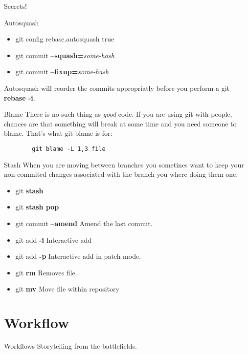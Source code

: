 \documentclass{beamer}
\begin{document}
\begin{frame}{Secrets!}
  \begin{block}{Autosquash}
    \begin{itemize}
      \item git config rebase.autosquash true
      \item git commit \textbf{--squash=}\emph{some-hash}
      \item git commit \textbf{--fixup=}\emph{some-hash}
     \end{itemize}
     Autosquash will reorder the commits appropriatly before you perform a git \textbf{rebase -i}.
  \end{block}
  \begin{block}{Blame}
    There is no such thing as \textit{good} code. If you are using git with people, chances are that something will break at some time and you need someone to blame. That's what git blame is for:
    \begin{lstlisting}
        git blame -L 1,3 file
    \end{lstlisting}
  \end{block}
  \framebreak
  \begin{block}{Stash}
    When you are moving between branches you sometines want to keep your non-commited changes associated with the branch you where doing them one.
    \begin{itemize}
      \item git \textbf{stash}
      \item git \textbf{stash pop}
    \end{itemize}
  \end{block}

  \begin{itemize}
    \item git commit \textbf{--amend} Amend the last commit.
    \item git add \textbf{-i} Interactive add
    \item git add \textbf{-p} Interactive add in patch mode.
    \item git \textbf{rm} Removes file.
    \item git \textbf{mv} Move file within repository
  \end{itemize}
\end{frame}
\section{Workflow}
\begin{frame}{Workflows}
  \centering
  Storytelling from the battlefields.
\end{frame}
\end{document}

